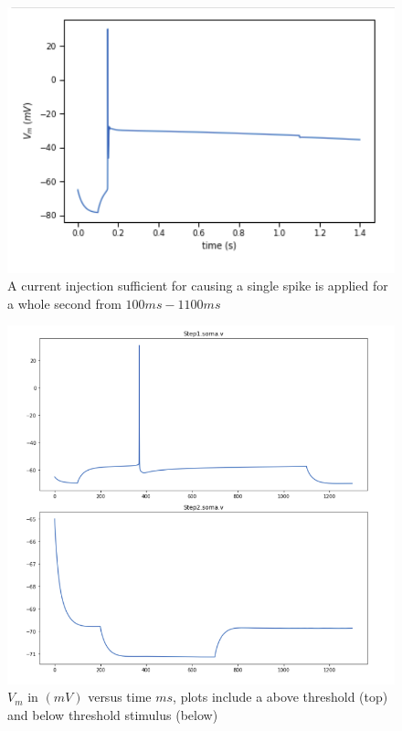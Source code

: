 \begin{center}

\begin{figure}
\centering
  \centering
   \includegraphics[scale=0.8]{figures/correct_active_l5pc.png}
    \caption{A current injection sufficient for causing a single spike is applied for a whole second from $100ms-1100ms$}
  \label{fig:sub1}
\end{figure}
\end{center}


\centering
\begin{figure}%
  \centering
    \includegraphics[scale=0.8]{figures/L5Somatosensory_not_optimized.png}
    \caption[Plot of at threshold firing pyramidal neuron]{$V_{m}$ in $(mV)$ versus time $ms$, plots include a above threshold (top) and below threshold stimulus (below)}
  \label{fig:brief_shape}
\end{figure}

